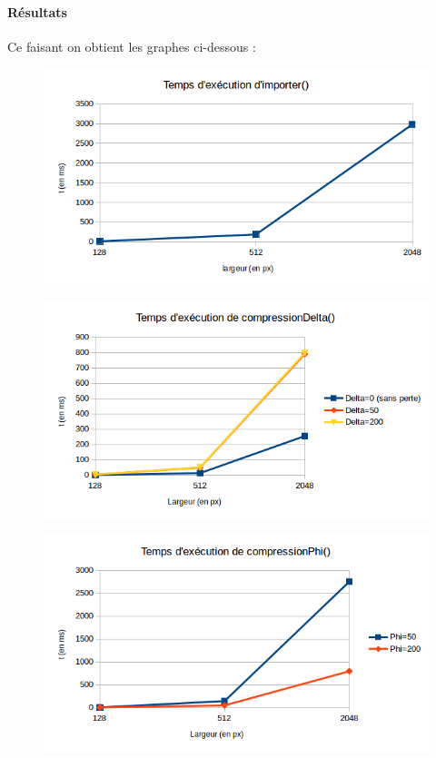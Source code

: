 \documentclass{article}
\begin{document}
	\paragraph{Résultats}
	
	Ce faisant on obtient les graphes ci-dessous :
	\begin{figure}[H]
		\begin{center}
			\includegraphics[scale=0.5]{grapheImporter}
			\label{grapheImporter}
		\end{center}
	\end{figure}
	\begin{figure}[H]
		\begin{center}
			\includegraphics[scale=0.5]{grapheCompressionDelta}
			\label{grapheCompressionDelta}
		\end{center}
	\end{figure}
	\begin{figure}[H]
		\begin{center}
			\includegraphics[scale=0.5]{grapheCompressionPhi}
			\label{grapheCompressionPhi}
		\end{center}
	\end{figure}
\end{document}
